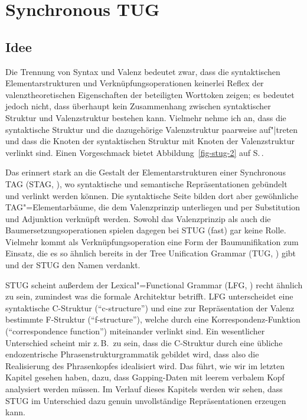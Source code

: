 \section{Synchronous TUG} \label{sec-stug-intro}

\subsection{Idee}

Die Trennung von Syntax und Valenz bedeutet zwar, dass die syntaktischen Elementarstrukturen und Verknüpfungsoperationen keinerlei Reflex der valenztheoretischen Eigenschaften der beteiligten Worttoken zeigen; es bedeutet jedoch nicht, dass überhaupt kein Zusammenhang zwischen syntaktischer Struktur und Valenzstruktur bestehen kann. Vielmehr nehme ich an, dass die syntaktische Struktur und die dazugehörige Valenzstruktur paarweise auf"|treten und dass die Knoten der syntaktischen Struktur mit Knoten der Valenzstruktur verlinkt sind. Einen Vorgeschmack bietet Abbildung~\ref{fig-stug-2} auf S.\,\pageref{fig-stug-2}.  

Das erinnert stark an die Gestalt der Elementarstrukturen einer Synchronous TAG (STAG, \citealt{Shieber:Schabes:90,Shieber:94,Nesson:Shieber:08}), wo syntaktische und semantische Repräsentationen gebündelt und verlinkt werden können. Die syntaktische Seite bilden dort aber gewöhnliche TAG"=Elementarbäume, die dem Valenzprinzip unterliegen und per Substitution und Adjunktion verknüpft werden. Sowohl das Valenzprinzip als auch die Baumersetzungsoperationen spielen dagegen bei STUG (fast) gar keine Rolle. Vielmehr kommt als Verknüpfungsoperation eine Form der Baumunifikation zum Einsatz, die es so ähnlich bereits in der Tree Unification Grammar (TUG, \citealt{Popowich:89,Gerdes:04}) gibt und der STUG den Namen verdankt.

STUG scheint außerdem der Lexical"=Functional Grammar (LFG, \citealt{Kaplan:Bresnan:82,Dalrymple:01,Asudeh:Toivonen:09}) recht ähnlich zu sein, zumindest was die formale Architektur betrifft. LFG unterscheidet eine syntaktische C-Struktur ("`c-structure"') und eine zur Repräsentation der Valenz bestimmte F-Struktur ("`f-structure"'), welche durch eine Korrespondenz-Funktion ("`correspondence function"') miteinander verlinkt sind. Ein wesentlicher Unterschied scheint mir z.\,B.\ zu sein, dass die C-Struktur durch eine übliche endozentrische Phrasenstrukturgrammatik gebildet wird, dass also die Realisierung des Phrasenkopfes idealisiert wird. Das führt, wie wir im letzten Kapitel gesehen haben, dazu, dass Gapping-Daten mit leerem verbalem Kopf analysiert werden müssen. Im Verlauf dieses Kapitels werden wir sehen, dass STUG im Unterschied dazu genuin unvollständige Repräsentationen erzeugen kann.


